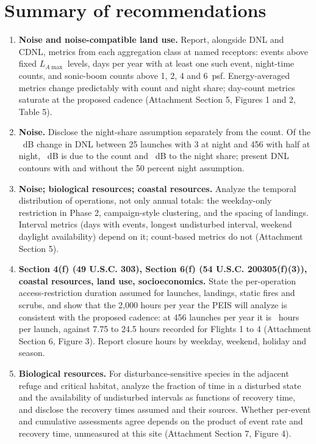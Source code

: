 \documentclass[11pt]{article}
\begin{document}
\clearpage
\section{Summary of recommendations}

\begin{enumerate}[leftmargin=*, itemsep=0pt]
\item \textbf{Noise and noise-compatible land use.} Report, alongside DNL and CDNL, metrics from each aggregation class at named receptors: events above fixed $L_{A\max}$ levels, days per year with at least one such event, night-time counts, and sonic-boom counts above 1, 2, 4 and 6~psf. Energy-averaged metrics change predictably with count and night share; day-count metrics saturate at the proposed cadence (Attachment Section 5, Figures 1 and 2, Table 5).
\item \textbf{Noise.} Disclose the night-share assumption separately from the count. Of the \valCfTotalTwoFiveFourFiveSixDb~dB change in DNL between 25 launches with 3 at night and 456 with half at night, \valCfCountTermTwoFiveFourFiveSixDb~dB is due to the count and \valCfNightTermZeroOneTwoZeroFiveDbOneDp~dB to the night share; present DNL contours with and without the 50 percent night assumption.
\item \textbf{Noise; biological resources; coastal resources.} Analyze the temporal distribution of operations, not only annual totals: the weekday-only restriction in Phase 2, campaign-style clustering, and the spacing of landings. Interval metrics (days with events, longest undisturbed interval, weekend daylight availability) depend on it; count-based metrics do not (Attachment Section 5).
\item \textbf{Section 4(f) (49 U.S.C. 303), Section 6(f) (54 U.S.C. 200305(f)(3)), coastal resources, land use, socioeconomics.} State the per-operation access-restriction duration assumed for launches, landings, static fires and scrubs, and show that the 2,000 hours per year the PEIS will analyze is consistent with the proposed cadence: at 456 launches per year it is \valBudgetPerLaunchTwoZeroZeroZeroNFourFiveSixH~hours per launch, against 7.75 to 24.5 hours recorded for Flights 1 to 4 (Attachment Section 6, Figure 3). Report closure hours by weekday, weekend, holiday and season.
\item \textbf{Biological resources.} For disturbance-sensitive species in the adjacent refuge and critical habitat, analyze the fraction of time in a disturbed state and the availability of undisturbed intervals as functions of recovery time, and disclose the recovery times assumed and their sources. Whether per-event and cumulative assessments agree depends on the product of event rate and recovery time, unmeasured at this site (Attachment Section 7, Figure 4).

\end{enumerate}
\end{document}
